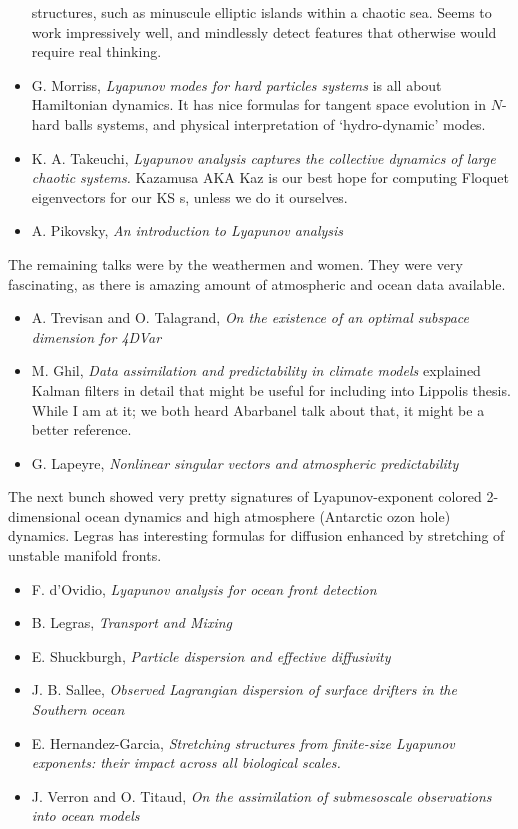 \begin{itemize}
      structures, such as minuscule elliptic islands
      within a chaotic sea. Seems to work impressively
      well, and mindlessly detect features that
      otherwise would require real thinking.
  \item G. Morriss, {\em Lyapunov modes for hard
      particles systems} is all about Hamiltonian
      dynamics. It has nice formulas for tangent space
      evolution in $N$-hard balls systems, and physical
      interpretation of `hydro-dynamic' modes.
  \item K. A. Takeuchi, {\em Lyapunov analysis captures
      the collective dynamics of large chaotic
      systems.} Kazamusa AKA Kaz is our best hope for
      computing Floquet eigenvectors for our KS \rpo s,
      unless we do it ourselves.

  \item A. Pikovsky, {\em An introduction to Lyapunov
      analysis
        }
  \end{itemize}
The remaining talks were by the weathermen and women. They were
very fascinating, as there is amazing amount of atmospheric and
ocean data available.
  \begin{itemize}
  \item A. Trevisan and O. Talagrand, {\em On the
      existence of an optimal subspace dimension for
        4DVar }
  \item M. Ghil, {\em Data assimilation and predictability
      in climate models} explained Kalman filters in detail
      that might be useful for including into Lippolis
      thesis. While I am at it; we both heard
      Abarbanel talk about that, it might be a
      better reference.
  \item G. Lapeyre, {\em Nonlinear singular vectors and
      atmospheric predictability }
  \end{itemize}
The next bunch showed very pretty signatures of
Lyapunov-exponent colored 2-dimensional ocean dynamics and
high atmosphere (Antarctic ozon hole) dynamics. Legras has
interesting formulas for diffusion enhanced by stretching
of unstable manifold fronts.
  \begin{itemize}
  \item F. d'Ovidio, {\em Lyapunov analysis for ocean
      front detection }
  \item B. Legras, {\em Transport and Mixing}
  \item E. Shuckburgh, {\em Particle dispersion and
      effective diffusivity }
  \item J. B. Sallee, {\em Observed Lagrangian
      dispersion of surface drifters in the Southern
      ocean }
  \item E. Hernandez-Garcia, {\em Stretching structures
      from finite-size Lyapunov exponents: their impact
      across all biological scales.}
 \item J. Verron and O. Titaud, {\em On the
     assimilation of submesoscale observations into
     ocean models }
  \end{itemize}

